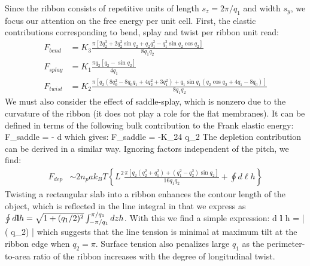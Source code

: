 Since the ribbon consists of repetitive units of length $s_{z} = 2\pi/q_{1}$ and width $s_{y}$, we focus our attention on the free energy per unit cell. First, the  elastic contributions corresponding to bend, splay and twist per  ribbon unit read:
\begin{align}
F_{bend} &=K_{3}
\frac{\pi \left[ 2 q_{2}^3+2 q_{2}^2 \sin q_{2}+q_{2}
   q_{1}^2-q_{1}^2 \sin q_{2} \cos q_{2} \right ]}{8 q_{1}
   q_{2}} \nonumber \\ 
F_{splay} &=  K_{1}
\frac{\pi q_{2}  \left[ q_{2} - \sin q_{2} \right ]  }{4 q_{1}}  \nonumber \\ 
F_{twist} &= K_{2} \frac{\pi  \left [ q_{2} \left(8 q_{0}^2-8 q_{0} q_{1}+4 q_{2}^2+3
   q_{1}^2\right)+q_{1} \sin q_{1} (q_{2} \cos
   q_{2}+4 q_{1}-8 q_{0})\right ] }{8 q_{1} q_{2}}
\end{align}
 We must also consider the effect of saddle-splay, which is nonzero due to the curvature of the ribbon (it does not play a role for the flat membranes). It can be defined in terms of the following bulk contribution to the Frank elastic energy: 
\beq
F_{saddle} = - \int d \bfr   [\nabla \cdot ( \bn \nabla \cdot \bn +  \bn \times \nabla \times \bn )]
\eeq
which gives:
\beq
F_{saddle} = -K_{24}  \sin q_{2}
\eeq
The depletion contribution  can be derived in a similar way. Ignoring factors independent of the pitch, we find:
\begin{align}
F_{dep}  & \sim  2 n_{p} a k_{B}T \left  \{ L^{2} \frac{\pi \left [ q_{2}(q_{2}^{2} + q_{1}^{2}) + (q_{1}^{2} - q_{2}^{2}) \sin q_{2}  \right ]  }{16 q_{1} q_{2}} + \oint d \ell h \right \} 
\end{align}
Twisting a rectangular slab into a ribbon enhances the contour length of the object, which is reflected in the line integral in  that we express as $\oint d {\bf l}h = \sqrt{1+ (q_{1}/2)^{2}}\int_{-\pi/q_{1}}^{\pi/q_{1}} dz h$. With this we find a simple expression:
\beq
 \oint d {\bf l} h  =  | \cos  ( q_{2}) |     
\eeq
which suggests  that the line tension is minimal at maximum tilt at the ribbon edge when $q_{2} = \pi $. Surface tension also penalizes large $q_{1}$ as the perimeter-to-area ratio of the ribbon increases with the degree of longitudinal twist.  

